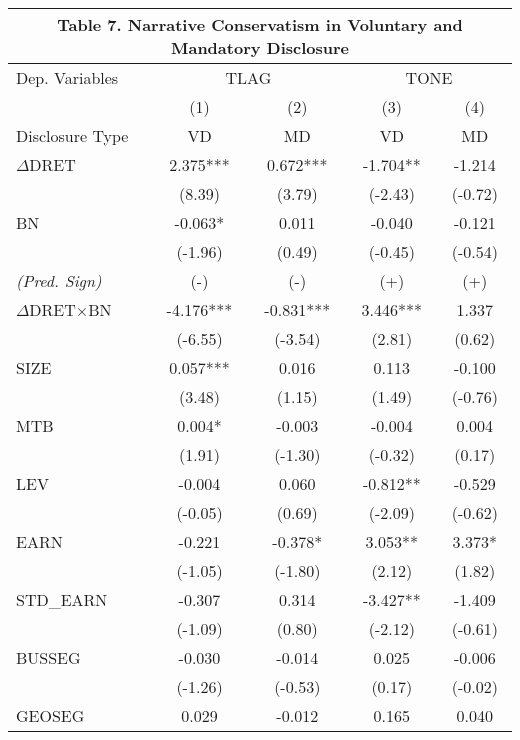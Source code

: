 \begin{table}[H] \label{T7}
	\begin{center}
		\tabcolsep=0.11cm
		\begin{tabular}{lcccc}
			\multicolumn{5}{c}{\textbf{Table 7. Narrative Conservatism in Voluntary and Mandatory Disclosure}} \\
			\toprule
			\toprule
			Dep. Variables & \multicolumn{2}{c}{TLAG} & \multicolumn{2}{c}{TONE} \\
			\cmidrule{2-5}
			& (1) & (2) & (3) & (4) \\
			Disclosure Type & VD & MD & VD & MD \\
			\midrule
			$\Delta$DRET & 2.375*** & 0.672*** & -1.704** & -1.214 \\
			& (8.39) & (3.79) & (-2.43) & (-0.72) \\
			BN & -0.063* & 0.011 & -0.040 & -0.121 \\
			& (-1.96) & (0.49) & (-0.45) & (-0.54) \\
			\rowcolor[rgb]{ .906,  .902,  .902} \textit{(Pred. Sign)} & (-) & (-) & (+) & (+) \\
			\rowcolor[rgb]{ .906,  .902,  .902} $\Delta$DRET$\times$BN & -4.176*** & -0.831*** & 3.446*** & 1.337 \\
			\rowcolor[rgb]{ .906,  .902,  .902} & (-6.55) & (-3.54) & (2.81) & (0.62) \\
			SIZE & 0.057*** & 0.016 & 0.113 & -0.100 \\
			& (3.48) & (1.15) & (1.49) & (-0.76) \\
			MTB & 0.004* & -0.003 & -0.004 & 0.004 \\
			& (1.91) & (-1.30) & (-0.32) & (0.17) \\
			LEV & -0.004 & 0.060 & -0.812** & -0.529 \\
			& (-0.05) & (0.69) & (-2.09) & (-0.62) \\
			EARN & -0.221 & -0.378* & 3.053** & 3.373* \\
			& (-1.05) & (-1.80) & (2.12) & (1.82) \\
			STD\_EARN & -0.307 & 0.314 & -3.427** & -1.409 \\
			& (-1.09) & (0.80) & (-2.12) & (-0.61) \\
			BUSSEG & -0.030 & -0.014 & 0.025 & -0.006 \\
			& (-1.26) & (-0.53) & (0.17) & (-0.02) \\
			GEOSEG & 0.029 & -0.012 & 0.165 & 0.040 \\

\end{tabular}
\end{center}
\end{table}
